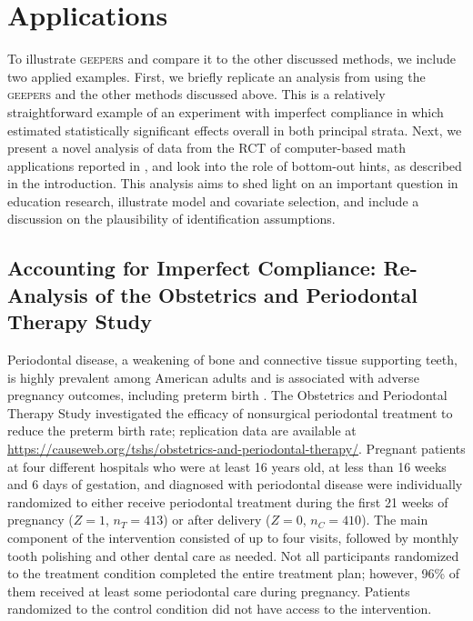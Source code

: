\documentclass[]{article}
\begin{document}
\section{Applications}
To illustrate \textsc{geepers} and compare it to the other discussed methods, we include two applied examples.
First, we briefly replicate an analysis from \citet{richardson2023estimating} using the \textsc{geepers} and the other methods discussed above.
This is a relatively straightforward example of an experiment with imperfect compliance in which \citet{richardson2023estimating} estimated statistically significant effects overall in both principal strata.
Next, we present a novel analysis of data from the RCT of computer-based math applications reported in \citet{impactPaper}, and look into the role of bottom-out hints, as described in the introduction.
This analysis aims to shed light on an important question in education research, illustrate model and covariate selection, and include a discussion on the plausibility of identification assumptions. 

\subsection{Accounting for Imperfect Compliance: Re-Analysis of the Obstetrics and Periodontal Therapy Study}
\sloppy
Periodontal disease, a weakening of bone and connective tissue supporting teeth, is highly prevalent among American adults and is associated with adverse pregnancy outcomes, including preterm birth \citep{periodontalEpi}.
The Obstetrics and Periodontal Therapy Study \citep[OPTS; ][]{michalowicz2006treatment} investigated the efficacy of nonsurgical periodontal treatment to reduce the preterm birth rate; replication data are available at \url{https://causeweb.org/tshs/obstetrics-and-periodontal-therapy/}.
Pregnant patients at four different hospitals who were at least 16 years old, at less than 16 weeks and 6 days of gestation, and diagnosed with periodontal disease were individually randomized to either receive periodontal treatment during the first 21 weeks of pregnancy ($Z=1$, $n_T=413$) or after delivery ($Z=0$, $n_C=410$).
The main component of the intervention consisted of up to four visits, followed by monthly tooth polishing and other dental care as needed. Not all participants randomized to the treatment condition completed the entire treatment plan; however, 96\% of them received at least some periodontal care during pregnancy.
Patients randomized to the control condition did not have access to the intervention.
\end{document}
